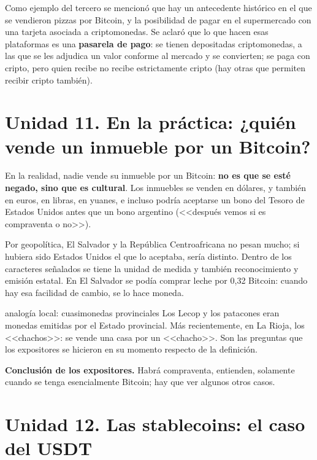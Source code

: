 \documentclass[12pt,oneside,a4paper]{book}
\begin{document}
Como ejemplo del tercero se mencionó que hay un antecedente histórico en el que se vendieron pizzas por Bitcoin, y la posibilidad de pagar en el supermercado con una tarjeta asociada a criptomonedas. Se aclaró que lo que hacen esas plataformas es una \textbf{pasarela de pago}: se tienen depositadas criptomonedas, a las que se les adjudica un valor conforme al mercado y se convierten; se paga con cripto, pero quien recibe no recibe estrictamente cripto (hay otras que permiten recibir cripto también).

\section{Unidad 11. En la práctica: ¿quién vende un inmueble por un Bitcoin?}

En la realidad, nadie vende su inmueble por un Bitcoin: \textbf{no es que se esté negado, sino que es cultural}. Los inmuebles se venden en dólares, y también en euros, en libras, en yuanes, e incluso podría aceptarse un bono del Tesoro de Estados Unidos antes que un bono argentino (<<después vemos si es compraventa o no>>).

Por geopolítica, El Salvador y la República Centroafricana no pesan mucho; si hubiera sido Estados Unidos el que lo aceptaba, sería distinto. Dentro de los caracteres señalados se tiene la unidad de medida y también reconocimiento y emisión estatal. En El Salvador se podía comprar leche por 0,32 Bitcoin: cuando hay esa facilidad de cambio, se lo hace moneda.

\begin{example}{analogía local: cuasimonedas provinciales}
Los Lecop y los patacones eran monedas emitidas por el Estado provincial. Más recientemente, en La Rioja, los <<chachos>>: se vende una casa por un <<chacho>>. Son las preguntas que los expositores se hicieron en su momento respecto de la definición.
\end{example}

\begin{important}
\textbf{Conclusión de los expositores.} Habrá compraventa, entienden, solamente cuando se tenga esencialmente Bitcoin; hay que ver algunos otros casos.
\end{important}

\section{Unidad 12. Las stablecoins: el caso del USDT}
\end{document}
